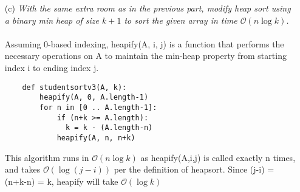 \documentclass[11pt]{article} \setlength{\oddsidemargin}{0in}
\begin{document}
{\begin{enumerate}
    Assuming 0-based indexing:
    \begin{verbatim}
    def studentsortv2(A, k):
        tmp = 0
        for n in [0 .. A.length-1]:
            for j in [1 .. k-1]:
                if (n+j < A.length and a[n] > a[n+j]):
                    tmp = a[n]
                    a[n] = a[n+j]
                    a[n+j] = tmp
    \end{verbatim}


    In the worst case, this algorithm runs in (5 x O(1)) [the if conditions, plus the swapping assignments] x O(k-1) [the inner loop] x O(n) [the outer loop] = O(nk).


    Essentially this algorithm is doing the same thing as the previous algorithm - looking ahead the next \textit{k} elements and putting the correct element in the first 'unknown' slot. However, in this algorithm we don't waste time sorting all k elements. The only element we can be sure about sorting into the correct final position is the element going into slot \textit{n} (i.e. the element at n+1 may need to be put at position k+1 in the next iteration, so it is wasted computation to sort it in this iteration). This algorithm simply looks at each next element up til n+k and swaps the element at n with the lowest - preserving the property that the leftmost region of A is sorted. 
    \\
  \newpage
  \item[(c)]{\textit{With the same extra room as in the previous part,
        modify heap sort using a binary min heap of size $k + 1$ to sort
        the given array in time $\mathcal{O}(n \log k)$.}}
    \\\\
    Assuming 0-based indexing, heapify(A, i, j) is a function that performs the necessary operations on A to maintain the min-heap property from starting index i to ending index j.

    \begin{verbatim}
    def studentsortv3(A, k):
        heapify(A, 0, A.length-1)
        for n in [0 .. A.length-1]:
            if (n+k >= A.length):
              k = k - (A.length-n)
            heapify(A, n, n+k)
    \end{verbatim}

    This algorithm runs in $\mathcal{O}(n \log k)$ as heapify(A,i,j) is called exactly n times, and takes $\mathcal{O}(\log (j-i))$ per the definition of heapsort. Since (j-i) = (n+k-n) = k, heapify will take $\mathcal{O}(\log k)$



\end{enumerate}}
\end{document}
